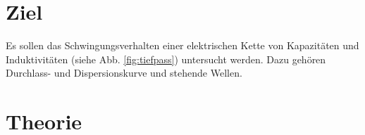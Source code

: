 \section{Ziel}
Es sollen das Schwingungsverhalten einer elektrischen Kette von Kapazitäten und Induktivitäten (siehe Abb. \ref{fig:tiefpass}) untersucht werden. Dazu gehören Durchlass- und Dispersionskurve und stehende Wellen.

\section{Theorie}
\label{sec:Theorie}
